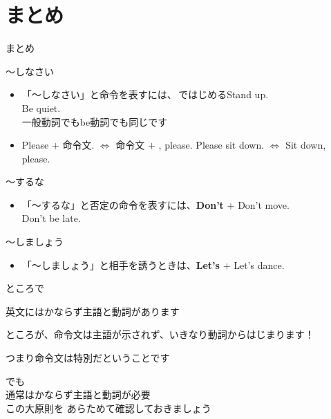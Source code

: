 \documentclass[aspectratio=169,xcolor={dvipsnames,table}]{beamer}
\begin{document}
\section{まとめ}
\begin{frame}[plain]{まとめ}

 \begin{block}{～しなさい}

\begin{itemize}[square]\small
 \item 「～しなさい」と命令を表すには、\,ではじめる\hfill{\scriptsize Stand up.}\\
\hfill{\scriptsize Be quiet.}\\
\hfill{\scriptsize 一般動詞でもbe動詞でも同じです}
 \item Please $+$ 命令文. $\Longleftrightarrow$ 命令文 $+$ , please.%
\hfill{\scriptsize Please sit down. $\Longleftrightarrow$ Sit down, please.}
\end{itemize}
  \end{block}


\begin{block}{～するな}
\begin{itemize}[square]\small
 \item 「～するな」と否定の命令を表すには、\textbf{Don't} $+$ \hfill{\scriptsize Don't move.}\\
\hfill{\scriptsize Don't be late.}
 \end{itemize}
    \end{block}

\begin{block}{～しましょう}
\begin{itemize}[square]\small
 \item 「～しましょう」と相手を誘うときは、\textbf{Let's} $+$ \hfill{\scriptsize Let's dance.}
 \end{itemize}
     \end{block}

\end{frame}
\begin{frame}[plain]{ところで}

\textdbend 
 英文にはかならず主語と動詞があります\pause

ところが、命令文は主語が示されず、いきなり動詞からはじまります！\pause

つまり命令文は特別だということです\pause

\bigskip

でも\\
通常はかならず主語と動詞が必要\\
この大原則を
あらためて確認しておきましょう
\end{frame}
\end{document}
